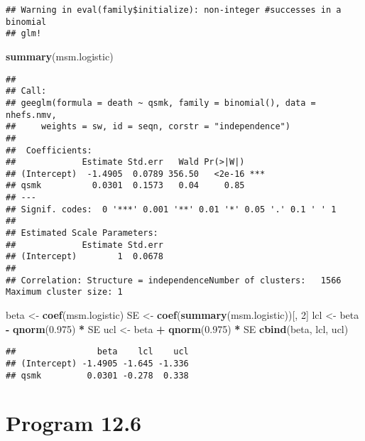 \documentclass[10pt,]{book}
\newenvironment{Shaded}{\begin{snugshade}}{\end{snugshade}}
\newcommand{\DecValTok}[1]{\textcolor[rgb]{0.00,0.00,0.81}{#1}}
\newcommand{\FloatTok}[1]{\textcolor[rgb]{0.00,0.00,0.81}{#1}}
\newcommand{\KeywordTok}[1]{\textcolor[rgb]{0.13,0.29,0.53}{\textbf{#1}}}
\newcommand{\NormalTok}[1]{#1}
\newcommand{\OperatorTok}[1]{\textcolor[rgb]{0.81,0.36,0.00}{\textbf{#1}}}
\newcommand{\StringTok}[1]{\textcolor[rgb]{0.31,0.60,0.02}{#1}}
\begin{document}
\begin{verbatim}
## Warning in eval(family$initialize): non-integer #successes in a binomial
## glm!
\end{verbatim}

\begin{Shaded}
\begin{Highlighting}[]
\KeywordTok{summary}\NormalTok{(msm.logistic)}
\end{Highlighting}
\end{Shaded}

\begin{verbatim}
## 
## Call:
## geeglm(formula = death ~ qsmk, family = binomial(), data = nhefs.nmv, 
##     weights = sw, id = seqn, corstr = "independence")
## 
##  Coefficients:
##             Estimate Std.err   Wald Pr(>|W|)    
## (Intercept)  -1.4905  0.0789 356.50   <2e-16 ***
## qsmk          0.0301  0.1573   0.04     0.85    
## ---
## Signif. codes:  0 '***' 0.001 '**' 0.01 '*' 0.05 '.' 0.1 ' ' 1
## 
## Estimated Scale Parameters:
##             Estimate Std.err
## (Intercept)        1  0.0678
## 
## Correlation: Structure = independenceNumber of clusters:   1566   Maximum cluster size: 1
\end{verbatim}

\begin{Shaded}
\begin{Highlighting}[]
\NormalTok{beta <-}\StringTok{ }\KeywordTok{coef}\NormalTok{(msm.logistic)}
\NormalTok{SE <-}\StringTok{ }\KeywordTok{coef}\NormalTok{(}\KeywordTok{summary}\NormalTok{(msm.logistic))[, }\DecValTok{2}\NormalTok{]}
\NormalTok{lcl <-}\StringTok{ }\NormalTok{beta }\OperatorTok{-}\StringTok{ }\KeywordTok{qnorm}\NormalTok{(}\FloatTok{0.975}\NormalTok{) }\OperatorTok{*}\StringTok{ }\NormalTok{SE}
\NormalTok{ucl <-}\StringTok{ }\NormalTok{beta }\OperatorTok{+}\StringTok{ }\KeywordTok{qnorm}\NormalTok{(}\FloatTok{0.975}\NormalTok{) }\OperatorTok{*}\StringTok{ }\NormalTok{SE}
\KeywordTok{cbind}\NormalTok{(beta, lcl, ucl)}
\end{Highlighting}
\end{Shaded}

\begin{verbatim}
##                beta    lcl    ucl
## (Intercept) -1.4905 -1.645 -1.336
## qsmk         0.0301 -0.278  0.338
\end{verbatim}

\hypertarget{program-12.6}{%
\section{Program 12.6}\label{program-12.6}}
\end{document}
